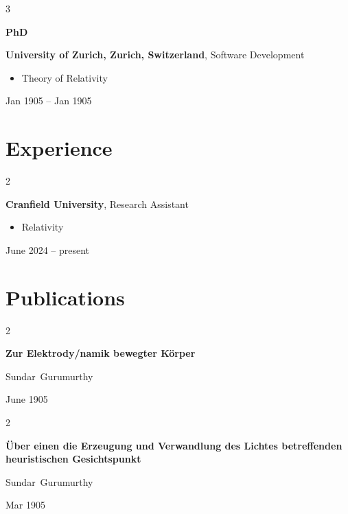 \documentclass[10pt, letterpaper]{article}
\newenvironment{highlights}{
    \begin{itemize}[
        topsep=0.10 cm,
        parsep=0.10 cm,
        partopsep=0pt,
        itemsep=0pt,
        leftmargin=0.4 cm + 10pt
    ]
}{
    \end{itemize}
} %
\newenvironment{twocolentry}[2][]{
    \onecolentry
    \def\secondColumn{#2}
    \setcolumnwidth{\fill, 4.5 cm}
    \begin{paracol}{2}
}{
    \switchcolumn \raggedleft \secondColumn
    \end{paracol}
    \endonecolentry
} %
\newenvironment{threecolentry}[3][]{
    \onecolentry
    \def\thirdColumn{#3}
    \setcolumnwidth{1 cm, \fill, 4.5 cm}
    \begin{paracol}{3}
    {\raggedright #2} \switchcolumn
}{
    \switchcolumn \raggedleft \thirdColumn
    \end{paracol}
    \endonecolentry
} %
\begin{document}
        
        \begin{threecolentry}{\textbf{PhD}}{
            Jan 1905 – Jan 1905
        }
            \textbf{University of Zurich, Zurich, Switzerland}, Software Development
            \begin{highlights}
                \item Theory of Relativity
            \end{highlights}
        \end{threecolentry}


    
    \section{Experience}



        
        \begin{twocolentry}{
            June 2024 – present
        }
            \textbf{Cranfield University}, Research Assistant
            \begin{highlights}
                \item Relativity
            \end{highlights}
        \end{twocolentry}



    
    \section{Publications}



        
        \begin{samepage}
            \begin{twocolentry}{
                June 1905
            }
                \textbf{Zur Elektrody/namik bewegter Körper}

                \vspace{0.10 cm}

                \mbox{Sundar Gurumurthy}
            \end{twocolentry}
        \end{samepage}

        \vspace{0.2 cm}

        \begin{samepage}
            \begin{twocolentry}{
                Mar 1905
            }
                \textbf{Über einen die Erzeugung und Verwandlung des Lichtes betreffenden heuristischen Gesichtspunkt}

                \vspace{0.10 cm}

                \mbox{Sundar Gurumurthy}
            \end{twocolentry}
        \end{samepage}
\end{document}
